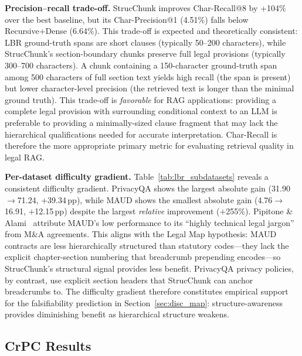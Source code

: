 \documentclass[sn-mathphys,Numbered]{sn-jnl}%
\begin{document}
\textbf{Precision--recall trade-off.}  StrucChunk improves Char-Recall@8 by +104\% over the best baseline, but its Char-Precision@1 (4.51\%) falls below Recursive+Dense (6.64\%).  This trade-off is expected and theoretically consistent: LBR ground-truth spans are short clauses (typically 50--200 characters), while StrucChunk's section-boundary chunks preserve full legal provisions (typically 300--700 characters).  A chunk containing a 150-character ground-truth span among 500 characters of full section text yields high recall (the span is present) but lower character-level precision (the retrieved text is longer than the minimal ground truth).  This trade-off is \emph{favorable} for RAG applications: providing a complete legal provision with surrounding conditional context to an LLM is preferable to providing a minimally-sized clause fragment that may lack the hierarchical qualifications needed for accurate interpretation.  Char-Recall is therefore the more appropriate primary metric for evaluating retrieval quality in legal RAG.

\textbf{Per-dataset difficulty gradient.}  Table~\ref{tab:lbr_subdatasets} reveals a consistent difficulty gradient.  PrivacyQA shows the largest absolute gain (31.90$\to$71.24, $+$39.34\,pp), while MAUD shows the smallest absolute gain (4.76$\to$16.91, $+$12.15\,pp) despite the largest \emph{relative} improvement ($+$255\%).  Pipitone \& Alami~\cite{pipitone2024legalbenchragbenchmarkretrievalaugmentedgeneration} attribute MAUD's low performance to its ``highly technical legal jargon'' from M\&A agreements.  This aligns with the Legal Map hypothesis: MAUD contracts are less hierarchically structured than statutory codes---they lack the explicit chapter-section numbering that breadcrumb prepending encodes---so StrucChunk's structural signal provides less benefit.  PrivacyQA privacy policies, by contrast, use explicit section headers that StrucChunk can anchor breadcrumbs to.  The difficulty gradient therefore constitutes empirical support for the falsifiability prediction in Section~\ref{sec:disc_map}: structure-awareness provides diminishing benefit as hierarchical structure weakens.

\subsection{CrPC Results}
\end{document}
